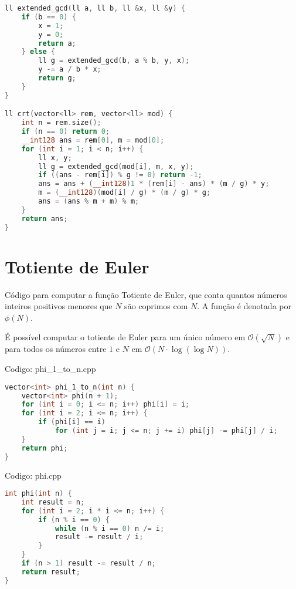 \documentclass[10pt, a4paper, oneside]{book}
\begin{document}
\begin{lstlisting}[language=C++]
ll extended_gcd(ll a, ll b, ll &x, ll &y) {
    if (b == 0) {
        x = 1;
        y = 0;
        return a;
    } else {
        ll g = extended_gcd(b, a % b, y, x);
        y -= a / b * x;
        return g;
    }
}

ll crt(vector<ll> rem, vector<ll> mod) {
    int n = rem.size();
    if (n == 0) return 0;
    __int128 ans = rem[0], m = mod[0];
    for (int i = 1; i < n; i++) {
        ll x, y;
        ll g = extended_gcd(mod[i], m, x, y);
        if ((ans - rem[i]) % g != 0) return -1;
        ans = ans + (__int128)1 * (rem[i] - ans) * (m / g) * y;
        m = (__int128)(mod[i] / g) * (m / g) * g;
        ans = (ans % m + m) % m;
    }
    return ans;
}
\end{lstlisting}
\hfill

\section{Totiente de Euler}


Código para computar a  função Totiente de Euler, que conta quantos números inteiros positivos menores que $N$ são coprimos com $N$. A função é denotada por $\phi(N)$.



É possível computar o totiente de Euler para um único número em $\mathcal{O}(\sqrt{N})$ e para todos os números entre $1$ e $N$ em $\mathcal{O}(N \cdot \log (\log N))$.

\hfill

Codigo: phi\_1\_to\_n.cpp

\begin{lstlisting}[language=C++]
vector<int> phi_1_to_n(int n) {
    vector<int> phi(n + 1);
    for (int i = 0; i <= n; i++) phi[i] = i;
    for (int i = 2; i <= n; i++) {
        if (phi[i] == i)
            for (int j = i; j <= n; j += i) phi[j] -= phi[j] / i;
    }
    return phi;
}
\end{lstlisting}
\hfill

Codigo: phi.cpp

\begin{lstlisting}[language=C++]
int phi(int n) {
    int result = n;
    for (int i = 2; i * i <= n; i++) {
        if (n % i == 0) {
            while (n % i == 0) n /= i;
            result -= result / i;
        }
    }
    if (n > 1) result -= result / n;
    return result;
}
\end{lstlisting}
\hfill
\end{document}
